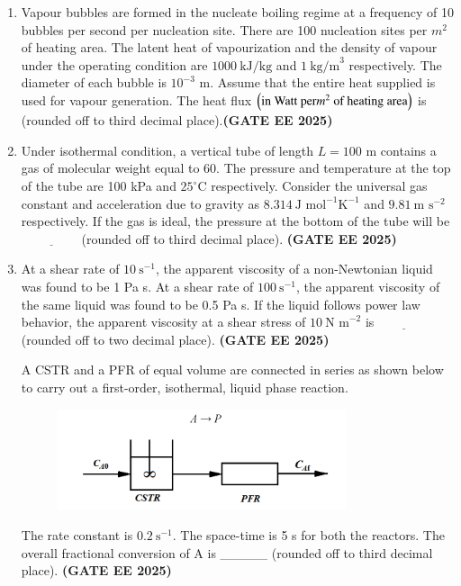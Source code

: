 \documentclass[journal,12pt,onecolumn]{IEEEtran}
\theoremstyle{remark}
\begin{document}
\begin{enumerate}
\item  Vapour bubbles are formed in the nucleate boiling regime at a frequency of 10 bubbles per second per nucleation site. There are 100 nucleation sites per $m^2$ of heating area. The latent heat of vapourization and the density of vapour under the operating condition are $1000~\text{kJ/kg}$ and $1~\text{kg/m}^{3}$ respectively. The diameter of each bubble is $10^{-3}$ m. Assume that the entire heat supplied is used for vapour generation. The heat flux $\left(\text{in Watt per} {m}^{2} \text{ of heating area}\right)$ is (rounded off to third decimal place).\hfill \textbf{(GATE EE 2025)}



\item Under isothermal condition, a vertical tube of length $L=100$ m contains a gas of molecular weight equal to 60. The pressure and temperature at the top of the tube are 100 kPa and $25^{\circ}\text{C}$ respectively. Consider the universal gas constant and acceleration due to gravity as $8.314~\text{J mol}^{-1}\text{K}^{-1}$ and $9.81~\text{m s}^{-2}$ respectively. If the gas is ideal, the pressure  at the bottom of the tube will be$\underline{\hspace{2cm}}$(rounded off to third decimal place). \hfill \textbf{(GATE EE 2025)} 



\item At a shear rate of $10~\text{s}^{-1}$, the apparent viscosity of a non-Newtonian liquid was found to be 1 Pa s. At a shear rate of $100~\text{s}^{-1}$, the apparent viscosity of the same liquid was found to be 0.5 Pa s. If the liquid follows power law behavior, the apparent viscosity  at a shear stress of $10~\text{N m}^{-2}$ is$\underline{\hspace{2cm}}$(rounded off to two decimal place). \hfill \textbf{(GATE EE 2025)} 



 A CSTR and a PFR of equal volume are connected in series as shown below to carry out a first-order, isothermal, liquid phase reaction.
 \begin{figure}
\begin{center}
\includegraphics[width=0.8\textwidth]{figs/39.png}
         \caption{}
	 \label{39}
\end{center}
 \end{figure}
The rate constant is $0.2~\text{s}^{-1}$. The space-time is 5 s for both the reactors. The overall fractional conversion of A is \_\_\_\_\_ (rounded off to third decimal place). \hfill \textbf{(GATE EE 2025)} 




\end{enumerate}
\end{document}
